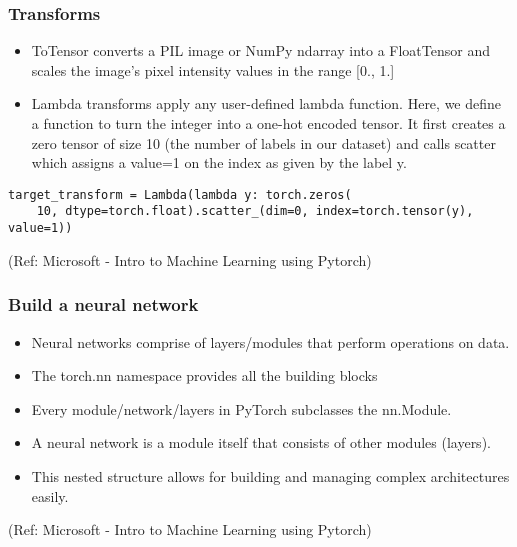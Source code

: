 \begin{frame}[fragile] \frametitle{Transforms}

\begin{itemize}
\item ToTensor converts a PIL image or NumPy ndarray into a FloatTensor and scales the image's pixel intensity values in the range [0., 1.]
\item Lambda transforms apply any user-defined lambda function. Here, we define a function to turn the integer into a one-hot encoded tensor. It first creates a zero tensor of size 10 (the number of labels in our dataset) and calls scatter which assigns a value=1 on the index as given by the label y.
\end{itemize}

\begin{lstlisting}
target_transform = Lambda(lambda y: torch.zeros(
    10, dtype=torch.float).scatter_(dim=0, index=torch.tensor(y), value=1))
\end{lstlisting}

\tiny{(Ref: Microsoft - Intro to Machine Learning using Pytorch)}
\end{frame}

\begin{frame}[fragile] \frametitle{Build a neural network}

\begin{itemize}
\item Neural networks comprise of layers/modules that perform operations on data. 
\item The torch.nn namespace provides all the building blocks 
\item Every module/network/layers in PyTorch subclasses the nn.Module. 
\item A neural network is a module itself that consists of other modules (layers). 
\item This nested structure allows for building and managing complex architectures easily.
\end{itemize}


\tiny{(Ref: Microsoft - Intro to Machine Learning using Pytorch)}
\end{frame}


